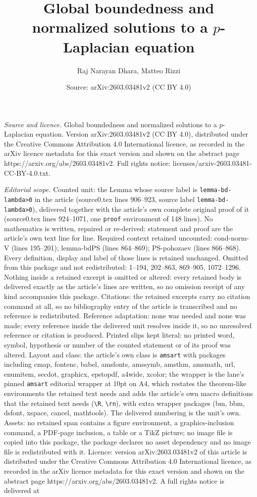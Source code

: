 \documentclass[10pt,a4paper]{amsart}
\title[Global boundedness and normalized solutions to a $p$-Laplaci]{Global boundedness and normalized solutions to a $p$-Laplacian equation}
\author{Raj Narayan Dhara, Matteo Rizzi}
\date{Source: arXiv:2603.03481v2 (CC BY 4.0)}
\begin{document}
\maketitle

\noindent\emph{Source and licence.} Global boundedness and normalized solutions to a $p$-Laplacian equation. Version arXiv:2603.03481v2 (CC BY 4.0), distributed under the Creative Commons Attribution 4.0 International licence, as recorded in the arXiv licence metadata for this exact version and shown on the abstract page https://arxiv.org/abs/2603.03481v2. Full rights notice: licenses/arxiv-2603.03481-CC-BY-4.0.txt.\par\smallskip

\noindent\textit{Editorial scope.} Counted unit: the Lemma whose source label is \texttt{lemma-bd-lambda>0} in the article (source0.tex lines 906--923, source label \texttt{lemma-bd-lambda>0}), delivered together with the article's own complete original proof of it (source0.tex lines 924--1071, one \texttt{proof} environment of 148 lines). No mathematics is written, repaired or re-derived: statement and proof are the article's own text line for line. Required context retained uncounted: cond-norm-V (lines 195--201); lemma-bdPS (lines 864--869); PS-pohozaev (lines 866--868). Every definition, display and label of those lines is retained unchanged. Omitted from this package and not redistributed: 1--194, 202--863, 869--905, 1072--1296. Nothing inside a retained excerpt is omitted or altered: every retained body is delivered exactly as the article's lines are written, so no omission receipt of any kind accompanies this package. Citations: the retained excerpts carry no citation command at all, so no bibliography entry of the article is transcribed and no reference is redistributed. Reference adaptation: none was needed and none was made; every reference inside the delivered unit resolves inside it, so no unresolved reference or citation is produced. Printed slips kept literal: no printed word, symbol, hypothesis or number of the counted statement or of its proof was altered. Layout and class: the article's own class is \texttt{amsart} with packages including cmap, fontenc, babel, amsfonts, amssymb, amsthm, amsmath, url, enumitem, secdot, graphicx, epstopdf, a4wide, xcolor; the wrapper is the lane's pinned \texttt{amsart} editorial wrapper at 10pt on A4, which restates the theorem-like environments the retained text needs and adds the article's own macro definitions that the retained text needs (\texttt{\textbackslash R}, \texttt{\textbackslash rn}), with extra wrapper packages (bm, bbm, dsfont, xspace, cancel, mathtools). The delivered numbering is the unit's own. Assets: no retained span contains a figure environment, a graphics-inclusion command, a PDF-page inclusion, a table or a TikZ picture; no image file is copied into this package, the package declares no asset dependency and no image file is redistributed with it. Licence: version arXiv:2603.03481v2 of this article is distributed under the Creative Commons Attribution 4.0 International licence, as recorded in the arXiv licence metadata for this exact version and shown on the abstract page https://arxiv.org/abs/2603.03481v2. A full rights notice is delivered at 
\end{document}

